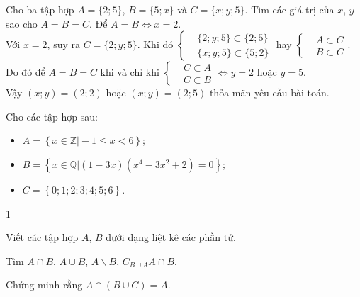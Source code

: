 \setcounter{bt}{0}
\begin{bt}%
	Cho ba tập hợp $A=\{2;5\}$, $B=\{5;x\}$ và $C=\{x;y;5\}$. Tìm các giá trị của $x$, $y$ sao cho $A=B=C$.
	\loigiai
	{
	Để $A=B \Leftrightarrow x=2$.\\
	Với $x=2$, suy ra $C=\{2;y;5\}$. Khi đó $\left\{\begin{aligned}
	&\{2;y;5\}\subset \{2;5\}\\
	&\{x;y;5\}\subset \{5;2\}
	\end{aligned}\right. $ hay $\left\{\begin{aligned}
	&A\subset C\\
	&B\subset C
	\end{aligned}\right. $.\\
	Do đó để $A=B=C$ khi và chỉ khi $\left\{\begin{aligned}
	&C\subset A\\
	&C\subset B
	\end{aligned}\right. \Leftrightarrow y=2$ hoặc $y=5$.\\
	Vậy $(x;y)=(2;2)$ hoặc $(x;y)=(2;5)$ thỏa mãn yêu cầu bài toán.
	}
\end{bt}
\begin{bt}%
	Cho các tập hợp sau:
	\begin{itemize}
		\item [] $A=\left\{\left. x\in \mathbb{Z}\right|-1\le x<6\right\}$;
		\item [] $B=\left\{\left. x\in \mathbb{Q}\right|\left(1-3x\right)\left({x}^4-3x^2+2\right)=0\right\}$;
		\item [] $C=\left\{0;1;2;3;4;5;6\right\}$.
	\end{itemize}
	\begin{enumEX}{1}
		\item Viết các tập hợp $A$, $B$ dưới dạng liệt kê các phần tử.
		\item Tìm $A\cap B$, $A\cup B$, $A\backslash B$, ${C}_{B\cup A}A\cap B$.
		\item Chứng minh rằng $A\cap (B\cup C)=A.$
	\end{enumEX}
\end{bt}
